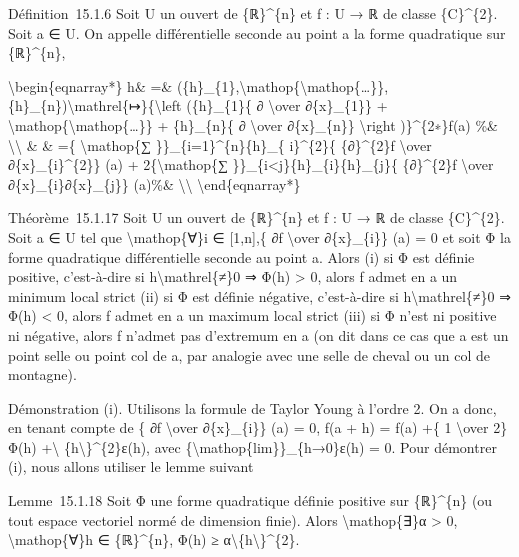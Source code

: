 \documentclass[]{article}
\begin{document}
Définition~15.1.6 Soit U un ouvert de \{ℝ\}\^{}\{n\} et f : U → ℝ de
classe \{C\}\^{}\{2\}. Soit a ∈ U. On appelle différentielle seconde au
point a la forme quadratique sur \{ℝ\}\^{}\{n\},

\textbackslash{}begin\{eqnarray*\} h\& =\&
(\{h\}\_\{1\},\textbackslash{}mathop\{\textbackslash{}mathop\{\ldots{}\}\},\{h\}\_\{n\})\textbackslash{}mathrel\{↦\}\{\textbackslash{}left
(\{h\}\_\{1\}\{ ∂ \textbackslash{}over ∂\{x\}\_\{1\}\} +
\textbackslash{}mathop\{\textbackslash{}mathop\{\ldots{}\}\} +
\{h\}\_\{n\}\{ ∂ \textbackslash{}over ∂\{x\}\_\{n\}\}
\textbackslash{}right )\}\^{}\{2∗\}f(a) \%\&
\textbackslash{}\textbackslash{} \& \& =\{ \textbackslash{}mathop\{∑
\}\}\_\{i=1\}\^{}\{n\}\{h\}\_\{ i\}\^{}\{2\}\{ \{∂\}\^{}\{2\}f
\textbackslash{}over ∂\{x\}\_\{i\}\^{}\{2\}\} (a) +
2\{\textbackslash{}mathop\{∑
\}\}\_\{i\textless{}j\}\{h\}\_\{i\}\{h\}\_\{j\}\{ \{∂\}\^{}\{2\}f
\textbackslash{}over ∂\{x\}\_\{i\}∂\{x\}\_\{j\}\} (a)\%\&
\textbackslash{}\textbackslash{} \textbackslash{}end\{eqnarray*\}

Théorème~15.1.17 Soit U un ouvert de \{ℝ\}\^{}\{n\} et f : U → ℝ de
classe \{C\}\^{}\{2\}. Soit a ∈ U tel que \textbackslash{}mathop\{∀\}i ∈
{[}1,n{]},\{ ∂f \textbackslash{}over ∂\{x\}\_\{i\}\} (a) = 0 et soit Φ
la forme quadratique différentielle seconde au point a. Alors (i) si Φ
est définie positive, c'est-à-dire si h\textbackslash{}mathrel\{≠\}0 ⇒
Φ(h) \textgreater{} 0, alors f admet en a un minimum local strict (ii)
si Φ est définie négative, c'est-à-dire si
h\textbackslash{}mathrel\{≠\}0 ⇒ Φ(h) \textless{} 0, alors f admet en a
un maximum local strict (iii) si Φ n'est ni positive ni négative, alors
f n'admet pas d'extremum en a (on dit dans ce cas que a est un point
selle ou point col de a, par analogie avec une selle de cheval ou un col
de montagne).

Démonstration (i). Utilisons la formule de Taylor Young à l'ordre 2. On
a donc, en tenant compte de \{ ∂f \textbackslash{}over ∂\{x\}\_\{i\}\}
(a) = 0, f(a + h) = f(a) +\{ 1 \textbackslash{}over 2\} Φ(h)
+\textbackslash{}\textbar{}
\{h\textbackslash{}\textbar{}\}\^{}\{2\}ε(h), avec
\{\textbackslash{}mathop\{lim\}\}\_\{h→0\}ε(h) = 0. Pour démontrer (i),
nous allons utiliser le lemme suivant

Lemme~15.1.18 Soit Φ une forme quadratique définie positive sur
\{ℝ\}\^{}\{n\} (ou tout espace vectoriel normé de dimension finie).
Alors \textbackslash{}mathop\{∃\}α \textgreater{} 0,
\textbackslash{}mathop\{∀\}h ∈ \{ℝ\}\^{}\{n\}, Φ(h) ≥
α\textbackslash{}\textbar{}\{h\textbackslash{}\textbar{}\}\^{}\{2\}.
\end{document}
